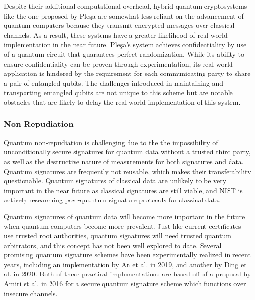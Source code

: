 \documentclass[sigconf]{acmart}
\begin{document}
Despite their additional computational overhead, hybrid quantum cryptosystems like the one proposed by Pleşa are somewhat less reliant on the advancement of quantum computers because they transmit encrypted messages over classical channels. As a result, these systems have a greater likelihood of real-world implementation in the near future. Pleşa's system achieves confidentiality by use of a quantum circuit that guarantees perfect randomization\cite{plesa_hybrid_2017}. While its ability to ensure confidentiality can be proven through experimentation, its real-world application is hindered by the requirement for each communicating party to share a pair of entangled qubits. The challenges introduced in maintaining and transporting entangled qubits are not unique to this scheme but are notable obstacles that are likely to delay the real-world implementation of this system.


\subsubsection{Non-Repudiation}
Quantum non-repudiation is challenging due to the the impossibility of unconditionally secure signatures for quantum data without a trusted third party, as well as the destructive nature of measurements for both signatures and data. Quantum signatures are frequently not reusable, which makes their transferability questionable. Quantum signatures of classical data are unlikely to be very important in the near future as classical signatures are still viable, and NIST is actively researching post-quantum signature protocols for classical data. 

Quantum signatures of quantum data will become more important in the future when quantum computers become more prevalent. Just like current certificates use trusted root authorities, quantum signatures will need trusted quantum arbitrators, and this concept has not been well explored to date. Several promising quantum signature schemes have been experimentally realized in recent years, including an implementation by An et al.\cite{an_practical_2019} in 2019, and another by Ding et al.\cite{ding_280-km_2020} in 2020. Both of these practical implementations are based off of a proposal by Amiri et al.\cite{amiri_secure_2016} in 2016 for a secure quantum signature scheme which functions over insecure channels. 
\end{document}
